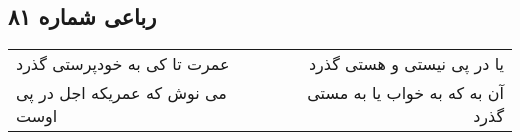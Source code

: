 \begin{center}
\section*{رباعی شماره ۸۱}
\label{sec:sh081}
\begin{longtable}{l p{0.5cm} r}
عمرت تا کی به خودپرستی گذرد
&&
یا در پی نیستی و هستی گذرد
\\
می نوش که عمریکه اجل در پی اوست
&&
آن به که به خواب یا به مستی گذرد
\\
\end{longtable}
\end{center}
